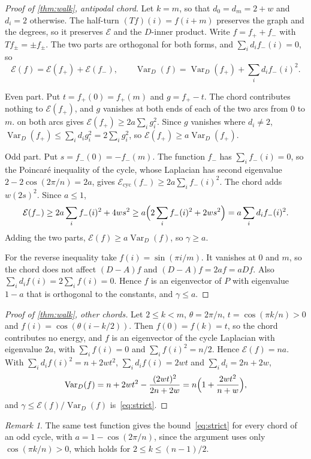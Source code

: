 \documentclass[11pt]{amsart}
\theoremstyle{remark}
\newtheorem{remark}[theorem]{Remark}
\begin{document}
\begin{proof}[Proof of \cref{thm:walk}, antipodal chord]
Let $k=m$, so that $d_0=d_m=2+w$ and $d_i=2$ otherwise. The half-turn $(Tf)(i)=f(i+m)$ preserves the graph and the
degrees, so it preserves $\mathcal E$ and the $D$-inner product. Write $f=f_++f_-$ with $Tf_\pm=\pm f_\pm$. The two
parts are orthogonal for both forms, and $\sum_id_if_-(i)=0$, so
\[
\mathcal E(f)=\mathcal E(f_+)+\mathcal E(f_-),\qquad \operatorname{Var}_D(f)=\operatorname{Var}_D(f_+)+\sum_id_if_-(i)^2 .
\]

Even part. Put $t=f_+(0)=f_+(m)$ and $g=f_+-t$. The chord contributes nothing to $\mathcal E(f_+)$, and $g$ vanishes at
both ends of each of the two arcs from $0$ to $m$.  on both arcs gives
$\mathcal E(f_+)\ge2a\sum_ig_i^2$. Since $g$ vanishes where $d_i\ne2$,
$\operatorname{Var}_D(f_+)\le\sum_id_ig_i^2=2\sum_ig_i^2$, so $\mathcal E(f_+)\ge a\operatorname{Var}_D(f_+)$.

Odd part. Put $s=f_-(0)=-f_-(m)$. The function $f_-$ has $\sum_if_-(i)=0$, so the Poincar\'e inequality of the cycle,
whose Laplacian has second eigenvalue $2-2\cos(2\pi/n)=2a$, gives
$\mathcal E_{\mathrm{cyc}}(f_-)\ge2a\sum_if_-(i)^2$. The chord adds $w(2s)^2$. Since $a\le1$,
\[
\mathcal E(f_-)\ge2a\sum_if_-(i)^2+4ws^2\ge a\Bigl(2\sum_if_-(i)^2+2ws^2\Bigr)=a\sum_id_if_-(i)^2 .
\]
Adding the two parts, $\mathcal E(f)\ge a\operatorname{Var}_D(f)$, so $\gamma\ge a$.

For the reverse inequality take $f(i)=\sin(\pi i/m)$. It vanishes at $0$ and $m$, so the chord does not affect
$(D-A)f$ and $(D-A)f=2af=aDf$. Also $\sum_id_if(i)=2\sum_if(i)=0$. Hence $f$ is an eigenvector of $P$ with eigenvalue
$1-a$ that is orthogonal to the constants, and $\gamma\le a$.
\end{proof}

\begin{proof}[Proof of \cref{thm:walk}, other chords]
Let $2\le k<m$, $\theta=2\pi/n$, $t=\cos(\pi k/n)>0$ and $f(i)=\cos(\theta(i-k/2))$. Then $f(0)=f(k)=t$, so the
chord contributes no energy, and $f$ is an eigenvector of the cycle Laplacian with eigenvalue $2a$, with
$\sum_if(i)=0$ and $\sum_if(i)^2=n/2$. Hence $\mathcal E(f)=na$. With $\sum_id_if(i)^2=n+2wt^2$,
$\sum_id_if(i)=2wt$ and $\sum_id_i=2n+2w$,
\[
\operatorname{Var}_D(f)=n+2wt^2-\frac{(2wt)^2}{2n+2w}=n\Bigl(1+\frac{2wt^2}{n+w}\Bigr),
\]
and $\gamma\le\mathcal E(f)/\operatorname{Var}_D(f)$ is~\eqref{eq:strict}.
\end{proof}

\begin{remark}
The same test function gives the bound~\eqref{eq:strict} for every chord of an odd cycle, with $a=1-\cos(2\pi/n)$, since
the argument uses only $\cos(\pi k/n)>0$, which holds for $2\le k\le(n-1)/2$.
\end{remark}
\end{document}
